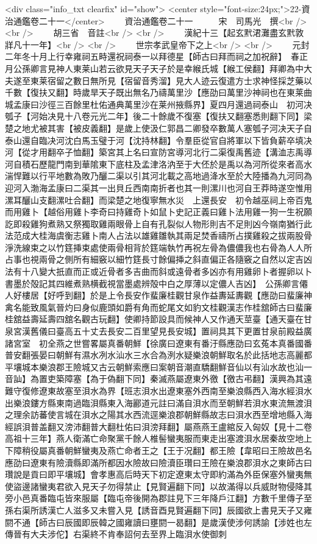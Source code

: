 <div class="info_txt clearfix" id="show">
<center style="font-size:24px;">22-資治通鑑卷二十一</center>
  　　資治通鑑卷二十一　　　宋　司馬光　撰<br />
<br />
　　胡三省　音註<br />
<br />
　　漢紀十三【起玄黓涒灘盡玄黓敦牂凡十一年】<br />
<br />
　　世宗孝武皇帝下之上<br />
<br />
　　元封二年冬十月上行幸雍祠五畤還祝祠泰一以拜德星【師古曰拜而祠之加祝辭】　春正月公孫卿言見神人東莱山若云欲見天子天子於是幸緱氏城【緱工侯翻】拜卿為中大夫遂至東莱宿留之數日無所見【宿留音秀溜】見大人迹云復遣方士求神怪採芝藥以千數【復扶又翻】時歲旱天子既出無名乃禱萬里沙【應劭曰萬里沙神祠也在東莱曲城孟康曰沙徑三百餘里杜佑通典萬里沙在莱州掖縣界】夏四月還過祠泰山　初河决瓠子【河始决見十八卷元光二年】後二十餘歲不復塞【復扶又翻塞悉則翻下同】梁楚之地尤被其害【被皮義翻】是歲上使汲仁郭昌二卿發卒數萬人塞瓠子河决天子自泰山還自臨决河沈白馬玉璧于河【沈持林翻】令羣臣從官自將軍以下皆負薪卒填决河【從才用翻卒子恤翻】築宮其上名曰宣防宮導河北行二渠復禹舊迹【溝洫志禹導河自積石歷龍門南到華隂東下底柱及孟津洛汭至于大伾於是禹以為河所從來者高水湍悍難以行平地數為敗乃釃二渠以引其河北載之高地過洚水至於大陸播為九河同為迎河入渤海孟康曰二渠其一出貝丘西南南折者也其一則漯川也河自王莽時遂空惟用漯耳釃山支翻漯吐合翻】而梁楚之地復寧無水災　上還長安　初令越巫祠上帝百鬼而用雞卜【越俗用雞卜李奇曰持雞奇卜如鼠卜史記正義曰雞卜法用雞一狗一生祝願訖即殺雞狗煮熟又祭獨取雞兩眼骨上自有孔裂似人物形則吉不足則凶今嶺南猶行此法范成大桂海虞衡志雞卜南人占法以雄雞雛執其兩足焚香禱所占撲雞殺之拔兩股骨淨洗線束之以竹筳挿束處使兩骨相背於筳端執竹再祝左骨為儂儂我也右骨為人人所占事也視兩骨之側所有細竅以細竹筳長寸餘偏挿之斜直偏正各隨竅之自然以定吉凶法有十八變大扺直而正或近骨者多吉曲而斜或遠骨者多凶亦有用雞卵卜者握卵以卜書墨於殻記其四維煮熟横截視當墨處辨殻中白之厚薄以定儂人吉凶】　公孫卿言僊人好樓居【好呼到翻】於是上令長安作蜚廉桂觀甘泉作益夀延夀觀【應劭曰蜚廉神禽名能致風氣晉灼曰身似鹿頭如爵有角而蛇尾文如豹文桂觀漢志作桂舘師古曰蜚廉桂舘益壽延壽四舘名觀古玩翻】使卿持節設具而候神人又作通天莖臺【通天臺在甘泉宮漢舊儀曰臺高五十丈去長安二百里望見長安城】置祠具其下更置甘泉前殿益廣諸宮室　初全燕之世嘗畧屬真番朝鮮【徐廣曰遼東有番汙縣應劭曰玄菟本真番國番普安翻張晏曰朝鮮有濕水冽水汕水三水合為洌水疑樂浪朝鮮取名於此括地志高麗都平壤城本樂浪郡王險城又古云朝鮮索應曰案朝音潮直驕翻鮮音仙以有汕水故也汕一音訕】為置吏築障塞【為于偽翻下同】秦滅燕屬遼東外徼【徼古弔翻】漢興為其遠難守復修遼東故塞至浿水為界【班志浿水出遼東塞外西南至樂浪縣西入海水經浿水出樂浪鏤方縣東南過臨浿縣東入海酈道元註曰滿自浿水而至朝鮮若浿水東流無渡浿之理余訪蕃使言城在浿水之陽其水西流逕樂浪郡朝鮮縣故志曰浿水西至增地縣入海經誤浿普盖翻又滂沛翻普大翻杜佑曰浿滂拜翻】屬燕燕王盧綰反入匈奴【見十二卷高祖十三年】燕人衛滿亡命聚黨千餘人椎髻蠻夷服而東走出塞渡浿水居秦故空地上下障稍役屬真番朝鮮蠻夷及燕亡命者王之【王于况翻】都王險【韋昭曰王險故邑名應劭曰遼東有險瀆縣即滿所都因水險故曰險瀆臣瓚曰王險在樂浪郡浿水之東師古曰瓚說是貢曰即平壤城】會孝惠高后時天下初定遼東太守即約滿為外臣保塞外蠻夷無使盜邊諸蠻夷君欲入見天子勿得禁止【見賢遍翻下同】以故滿得以兵威財物侵降其旁小邑真番臨屯皆來服屬【臨屯帝後開為郡註見下三年降戶江翻】方數千里傳子至孫右渠所誘漢亡人滋多又未嘗入見【誘音酉見賢遍翻下同】辰國欲上書見天子又雍閼不通【師古曰辰國即辰韓之國雍讀曰壅閼一曷翻】是歲漢使涉何誘諭【涉姓也左傳晉有大夫涉佗】右渠終不肯奉詔何去至界上臨浿水使御刺